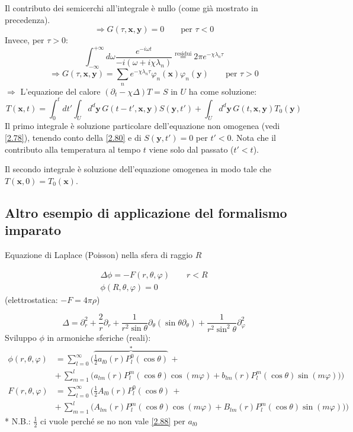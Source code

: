 \documentclass[a4paper,11pt]{report}
\newcommand{\x}{\boldsymbol{x}}
\newcommand{\y}{\boldsymbol{y}}
\begin{document}
Il contributo dei semicerchi all'integrale \`e nullo (come gi\`a mostrato in precedenza). %
\begin{equation}
\Rightarrow G(\tau,\x,\y)=0 \qquad \text{per } \tau<0
\label{2.80}
\end{equation}
Invece, per $\tau>0$:
\[
\int_{-\infty}^{+\infty} d\omega \frac{e^{-i\omega t}}{-i(\omega +i\chi\lambda_n)} \overset{\text{residui}}{=} 2\pi e^{-\chi \lambda_n \tau}
\]
\begin{equation}
\Rightarrow G(\tau,\x,\y)=\sum_{n} e^{-\chi\lambda_n \tau} \varphi_n (\x)\varphi_n (\y) \qquad \text{per }\tau>0
\label{2.81}
\end{equation}
$\Rightarrow$ L'equazione del calore $(\partial_t - \chi \Delta)T=S$ in $U$ ha come soluzione:
\begin{equation}
T(\x,t)=\int_0^t dt' \int_U d^d\y\, G(t-t',\x,\y)S(\y,t') + \int_U d^d\y\, G(t,\x,\y)T_0(\y)
\label{2.82}
\end{equation}
Il primo integrale \`e soluzione particolare dell'equazione non omogenea (vedi \eqref{2.78}), tenendo conto della \eqref{2.80} e di $S(\y,t')=0$ per $t'<0$.
Nota che il contributo alla temperatura al tempo $t$ viene solo dal passato ($t'<t$).

Il secondo integrale \`e  soluzione dell'equazione omogenea in modo tale che $T(\x,0)=T_0(\x)$.

\subsection{Altro esempio di applicazione del formalismo imparato}

Equazione di Laplace (Poisson) nella sfera di raggio $R$

\begin{equation}
\begin{gathered}
\Delta \phi=-F(r,\theta,\varphi) \qquad r<R\\
\phi(R,\theta,\varphi)=0
\end{gathered} 
\label{2.83}
\end{equation}
(elettrostatica: $-F=4\pi\rho$)

\[
\Delta = \partial_{r}^2 + \frac{2}{r}\partial_r + \frac{1}{r^2\sin\theta}\partial_\theta(\sin \theta \partial_\theta) + \frac{1}{r^2\sin^2\theta}\partial^2_{\varphi}
\]
Sviluppo $\phi$ in armoniche sferiche (reali):
\begin{equation}
\begin{aligned}
\phi(r,\theta,\varphi)&=\sum_{l=0}^{\infty}\Big(\overbrace{\frac{1}{2}a_{l0}(r)P^0_l(\cos\theta)}^{*} \,+\\
&+\, \sum_{m=1}^l\big(a_{lm}(r)P_l^m(\cos\theta)\cos (m\varphi) + b_{lm}(r)P_l^m (\cos\theta) \sin (m\varphi) \big)\Big) \\
F(r,\theta,\varphi)&=\sum_{l=0}^\infty\Big(\frac{1}{2} A_{l0}(r)P_l^0(\cos\theta) \,+\\
&+\, \sum_{m=1}^l \big(A_{lm}(r)P_l^m(\cos\theta)\cos (m\varphi) +B_{lm}(r)P_l^m(\cos\theta)\sin (m\varphi) \big)\Big)
\end{aligned}
\label{2.84}
\end{equation}
* N.B.: $\frac{1}{2}$ ci vuole perch\'e se no non vale \eqref{2.88} per $a_{l0}$
\end{document}

